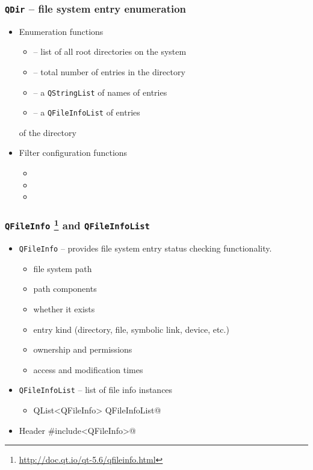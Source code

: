 \begin{frame}[fragile]
  \frametitle{\texttt{QDir} -- file system entry enumeration}
  \begin{itemize}
    \item Enumeration functions
    \begin{itemize}
      \item \verb@drives@ -- list of all root directories on the system
      \item \verb@count@ -- total number of entries in the directory
      \item \verb@entryList@ -- a \texttt{QStringList} of names of entries
      \item \verb@entryInfoList@ -- a \texttt{QFileInfoList} of entries
    \end{itemize}
    of the directory
    \item Filter configuration functions
    \begin{itemize}
      \item \verb@setFilter@
      \item \verb@setNameFilters@
      \item \verb@setSorting@
    \end{itemize}
  \end{itemize}
\end{frame}

\begin{frame}[fragile]
  \frametitle{\texttt{QFileInfo}
    \footnote{\url{http://doc.qt.io/qt-5.6/qfileinfo.html}} and
    \texttt{QFileInfoList}}
  \begin{itemize}
    \item \texttt{QFileInfo} -- provides file system entry status checking
      functionality.
    \begin{itemize}
      \item file system path
      \item path components
      \item whether it exists
      \item entry kind (directory, file, symbolic link, device, etc.)
      \item ownership and permissions
      \item access and modification times
    \end{itemize}
    \item \texttt{QFileInfoList} -- list of file info instances
    \begin{itemize}
      \item \verb@typedef QList<QFileInfo> QFileInfoList@
    \end{itemize}
    \item Header \verb@#include<QFileInfo>@
  \end{itemize}
\end{frame}

